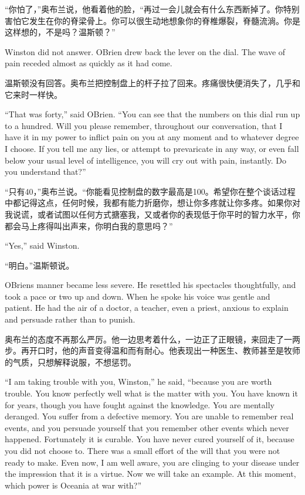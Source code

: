 \begin{paracol}{2}
\switchcolumn

``你怕了，''奥布兰说，他看着他的脸，``再过一会儿就会有什么东西断掉了。你特别害怕它发生在你的脊梁骨上。你可以很生动地想象你的脊椎爆裂，脊髓流淌。你是这样想的，不是吗？温斯顿？''

\switchcolumn*

Winston did not answer. O\textquotesingle Brien drew back the lever on
the dial. The wave of pain receded almost as quickly as it had come.

\switchcolumn

温斯顿没有回答。奥布兰把控制盘上的杆子拉了回来。疼痛很快便消失了，几乎和它来时一样快。

\switchcolumn*

``That was forty,'' said O\textquotesingle Brien. ``You can see that the
numbers on this dial run up to a hundred. Will you please remember,
throughout our conversation, that I have it in my power to inflict pain
on you at any moment and to whatever degree I choose. If you tell me any
lies, or attempt to prevaricate in any way, or even fall below your
usual level of intelligence, you will cry out with pain, instantly. Do
you understand that?''

\switchcolumn

``只有40，''奥布兰说。``你能看见控制盘的数字最高是100。希望你在整个谈话过程中都记得这点，任何时候，我都有能力折磨你，想让你多疼就让你多疼。如果你对我说谎，或者试图以任何方式搪塞我，又或者你的表现低于你平时的智力水平，你都会马上疼得叫出声来，你明白我的意思吗？''

\switchcolumn*

``Yes,'' said Winston.

\switchcolumn

``明白。''温斯顿说。

\switchcolumn*

O\textquotesingle Brien\textquotesingle s manner became less severe. He
resettled his spectacles thoughtfully, and took a pace or two up and
down. When he spoke his voice was gentle and patient. He had the air of
a doctor, a teacher, even a priest, anxious to explain and persuade
rather than to punish.

\switchcolumn

奥布兰的态度不再那么严厉。他一边思考着什么，一边正了正眼镜，来回走了一两步。再开口时，他的声音变得温和而有耐心。他表现出一种医生、教师甚至是牧师的气质，只想解释说服，不想惩罚。

\switchcolumn*

``I am taking trouble with you, Winston,'' he said, ``because you are worth
trouble. You know perfectly well what is the matter with you. You have
known it for years, though you have fought against the knowledge. You
are mentally deranged. You suffer from a defective memory. You are
unable to remember real events, and you persuade yourself that you
remember other events which never happened. Fortunately it is curable.
You have never cured yourself of it, because you did not choose to.
There was a small effort of the will that you were not ready to make.
Even now, I am well aware, you are clinging to your disease under the
impression that it is a virtue. Now we will take an example. At this
moment, which power is Oceania at war with?''


\end{paracol}
